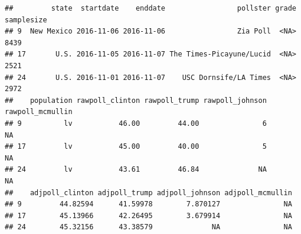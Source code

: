 \documentclass[
  12pt,
]{article}
\begin{document}
\begin{verbatim}
##         state  startdate    enddate                 pollster grade samplesize
## 9  New Mexico 2016-11-06 2016-11-06                 Zia Poll  <NA>       8439
## 17       U.S. 2016-11-05 2016-11-07 The Times-Picayune/Lucid  <NA>       2521
## 24       U.S. 2016-11-01 2016-11-07    USC Dornsife/LA Times  <NA>       2972
##    population rawpoll_clinton rawpoll_trump rawpoll_johnson rawpoll_mcmullin
## 9          lv           46.00         44.00               6               NA
## 17         lv           45.00         40.00               5               NA
## 24         lv           43.61         46.84              NA               NA
##    adjpoll_clinton adjpoll_trump adjpoll_johnson adjpoll_mcmullin
## 9         44.82594      41.59978        7.870127               NA
## 17        45.13966      42.26495        3.679914               NA
## 24        45.32156      43.38579              NA               NA
\end{verbatim}
\end{document}
